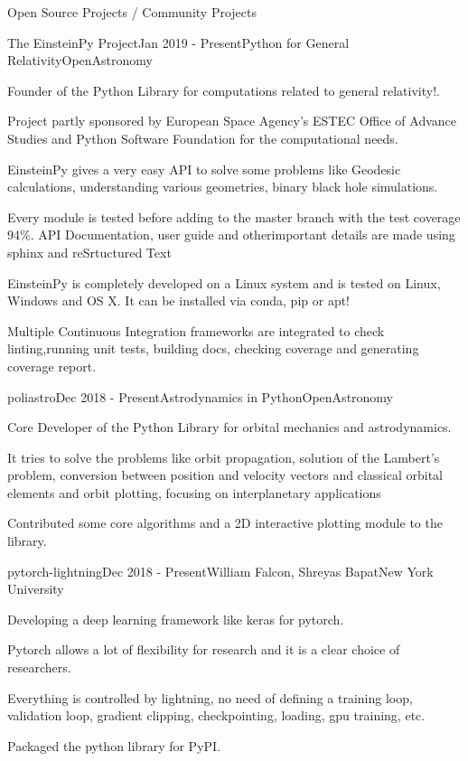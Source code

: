 \documentclass{resume} %
\begin{document}
\begin{rSection}{Open Source Projects / Community Projects}

\begin{rSubsection}{The EinsteinPy Project}{Jan 2019 - Present}{Python for General Relativity}{OpenAstronomy}
\item Founder of the Python Library for computations related to general relativity!.
\item  Project partly sponsored by European Space Agency's ESTEC Office of Advance Studies and Python Software Foundation for the computational needs. 
\item EinsteinPy gives a very easy API to solve some problems like Geodesic calculations, understanding various geometries, binary black hole simulations. 
\item Every module is tested before adding to the master branch with the test coverage 94\%. API Documentation, user guide and otherimportant details are made using sphinx and reSrtuctured Text
\item EinsteinPy is completely developed on a Linux system and is tested on Linux, Windows and OS X. It can be installed via conda, pip or apt!
\item Multiple Continuous Integration frameworks are integrated to check linting,running unit tests, building docs, checking coverage and generating coverage report.
 \end{rSubsection}

\begin{rSubsection}{poliastro}{Dec 2018 - Present}{Astrodynamics in Python}{OpenAstronomy}
\item Core Developer of the Python Library for orbital mechanics and astrodynamics.
\item  It tries to solve the problems like orbit propagation, solution of the Lambert's problem, conversion between position and velocity vectors and classical orbital elements and orbit plotting, focusing on interplanetary applications
\item Contributed some core algorithms and a 2D interactive plotting module to the library.
 \end{rSubsection}
 
   \begin{rSubsection}{pytorch-lightning}{Dec 2018 - Present}{William Falcon, Shreyas Bapat}{New York University}
\item Developing a deep learning framework like keras for pytorch. 
\item  Pytorch allows a lot of flexibility for research and it is a clear choice of researchers.
\item Everything is controlled by lightning, no need of defining a training loop, validation loop, gradient clipping, checkpointing, loading, gpu training, etc.
\item Packaged the python library for PyPI. 
 \end{rSubsection}
 

\end{rSection}
\end{document}
